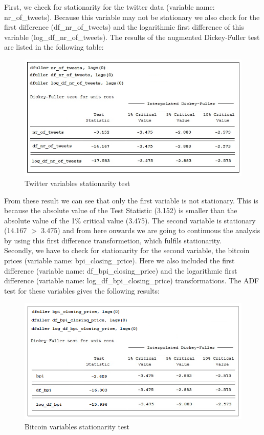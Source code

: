 \documentclass[a4paper,american,12pt]{article}
\begin{document}
\begin{spacing}{1.2}
First, we check for stationarity for the twitter data (variable name: nr\_of\_tweets). Because this variable may not be stationary we also check for the first difference (df\_nr\_of\_tweets) and the logarithmic first difference of this variable (log\_df\_nr\_of\_tweets). The results of the augmented Dickey-Fuller test are listed in the  following table:\\

\begin{figure}[H]
\centering
\includegraphics[scale=0.85]{stata_export_graphs/ADF_twitter_variables.png}
\caption{Twitter variables stationarity test}
\label{fig:3}
\end{figure}
	
From these result we can see that only the first variable is not stationary. This is because the absolute value of the Test Statistic (3.152) is smaller than the absolute value of the 1\% critical value (3.475). The second variable is stationary (14.167 $>$ 3.475) and from here onwards we are going to continuous the analysis by using this first difference transformetion, which fulfils stationarity.\\

Secondly, we have to check for stationarity for the second variable, the bitcoin prices (variable name: bpi\_closing\_price). Here we also included the first difference (variable name: df\_bpi\_closing\_price) and the logarithmic first difference (variable name: log\_df\_bpi\_closing\_price) transformations. The ADF test for these variables gives the following results:\\

\begin{figure}[H]
\centering
\includegraphics[scale=0.85]{stata_export_graphs/ADF_bpi_variables.png}
\caption{Bitcoin variables stationarity test}
\label{fig:4}
\end{figure}
	

\end{spacing}
\end{document}
